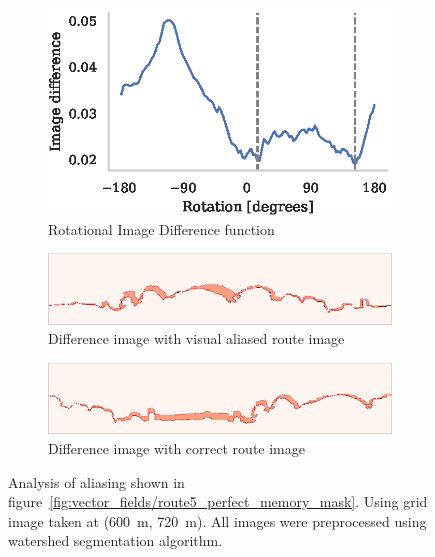 \documentclass[letterpaper]{article}
\begin{document}
\begin{figure}[t]
    \begin{subfigure}[b]{\columnwidth}
        \includegraphics[width=\columnwidth]{figures/alias_ridf.eps}
        \caption{Rotational Image Difference function}
        \label{fig:aliasing/ridf}
    \end{subfigure}
    
    \begin{subfigure}[b]{\columnwidth}
        \includegraphics[width=\columnwidth]{figures/image_diff_bad.png}
        \caption{Difference image with visual aliased route image}
        \label{fig:aliasing/image_diff_bad}
    \end{subfigure}
    
    \begin{subfigure}[b]{\columnwidth}
        \includegraphics[width=\columnwidth]{figures/image_diff_good.png}
        \caption{Difference image with correct route image}
        \label{fig:aliasing/image_diff_good}
    \end{subfigure}
    \caption{Analysis of aliasing shown in figure~\ref{fig:vector_fields/route5_perfect_memory_mask}.
    Using grid image taken at (\SI{600}{\metre}, \SI{720}{\metre}).
    All images were preprocessed using watershed segmentation algorithm.}
    \label{fig:aliasing}
\end{figure}
\end{document}
